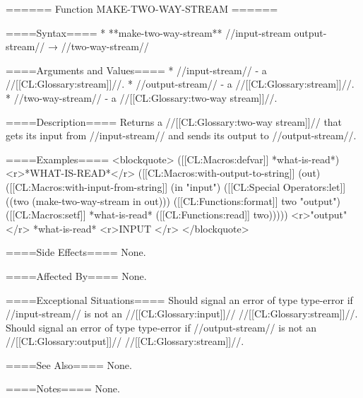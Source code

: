 ====== Function MAKE-TWO-WAY-STREAM ======

====Syntax====
  * **make-two-way-stream** //input-stream output-stream// → //two-way-stream//

====Arguments and Values====
  * //input-stream// - a //[[CL:Glossary:stream]]//.
  * //output-stream// - a //[[CL:Glossary:stream]]//.
  * //two-way-stream// - a //[[CL:Glossary:two-way stream]]//.

====Description====
Returns a //[[CL:Glossary:two-way stream]]// that gets its input from //input-stream// and sends its output to //output-stream//.

====Examples====
<blockquote>
([[CL:Macros:defvar]] *what-is-read*) <r>*WHAT-IS-READ*</r>
([[CL:Macros:with-output-to-string]] (out) 
  ([[CL:Macros:with-input-from-string]] (in "input") 
    ([[CL:Special Operators:let]] ((two (make-two-way-stream in out))) 
      ([[CL:Functions:format]] two "output") 
      ([[CL:Macros:setf]] *what-is-read* ([[CL:Functions:read]] two))))) <r>"output" </r>
*what-is-read* <r>INPUT </r>
</blockquote>

====Side Effects====
None.

====Affected By====
None.

====Exceptional Situations====
Should signal an error of type type-error if //input-stream// is not an //[[CL:Glossary:input]]// //[[CL:Glossary:stream]]//. Should signal an error of type type-error if //output-stream// is not an //[[CL:Glossary:output]]// //[[CL:Glossary:stream]]//.

====See Also====
None.

====Notes====
None.

